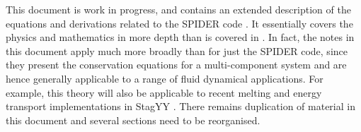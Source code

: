 This document is work in progress, and contains an extended description of the equations and derivations related to the SPIDER code \citep{BSW18}.  It essentially covers the physics and mathematics in more depth than is covered in \cite{ABE93,ABE95,BSW18}.  In fact, the notes in this document apply much more broadly than for just the SPIDER code, since they present the conservation equations for a multi-component system and are hence generally applicable to a range of fluid dynamical applications.  For example, this theory will also be applicable to recent melting and energy transport implementations in StagYY \citep{TACK08}.  There remains duplication of material in this document and several sections need to be reorganised.
